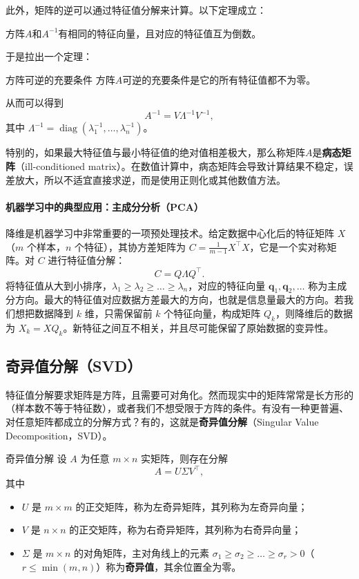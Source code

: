此外，矩阵的逆可以通过特征值分解来计算。以下定理成立：
\begin{theorem}{}{}
    方阵$A$和$A^{-1}$有相同的特征向量，且对应的特征值互为倒数。
\end{theorem}
于是拉出一个定理：
\begin{theorem}{方阵可逆的充要条件}{}
    方阵$A$可逆的充要条件是它的所有特征值都不为零。
\end{theorem}
从而可以得到
\[
    A^{-1} = V \Lambda^{-1} V^{-1},
\]
其中 \(\Lambda^{-1} = \operatorname{diag}(\lambda_1^{-1}, \dots, \lambda_n^{-1})\)。

特别的，如果最大特征值与最小特征值的绝对值相差极大，那么称矩阵$A$是\textbf{病态矩阵}（ill-conditioned matrix）。在数值计算中，病态矩阵会导致计算结果不稳定，误差放大，所以不适宜直接求逆，而是使用正则化或其他数值方法。

\paragraph{机器学习中的典型应用：主成分分析（PCA）}

降维是机器学习中非常重要的一项预处理技术。给定数据中心化后的特征矩阵 \(X\)（\(m\) 个样本，\(n\) 个特征），其协方差矩阵为 \(C = \frac{1}{m-1} X^\top X\)，它是一个实对称矩阵。对 \(C\) 进行特征值分解：
\[
    C = Q \Lambda Q^\top .
\]
将特征值从大到小排序，\(\lambda_1 \ge \lambda_2 \ge \dots \ge \lambda_n\)，对应的特征向量 \(\mathbf{q}_1, \mathbf{q}_2, \dots\) 称为主成分方向。最大的特征值对应数据方差最大的方向，也就是信息量最大的方向。若我们想把数据降到 \(k\) 维，只需保留前 \(k\) 个特征向量，构成矩阵 \(Q_k\)，则降维后的数据为 \(X_k = X Q_k\)。新特征之间互不相关，并且尽可能保留了原始数据的变异性。

\subsection{奇异值分解（SVD）}

特征值分解要求矩阵是方阵，且需要可对角化。然而现实中的矩阵常常是长方形的（样本数不等于特征数），或者我们不想受限于方阵的条件。有没有一种更普遍、对任意矩阵都成立的分解方式？有的，这就是\textbf{奇异值分解}（Singular Value Decomposition，SVD）。

\begin{theorem}{奇异值分解}{}
    设 \(A\) 为任意 \(m \times n\) 实矩阵，则存在分解
    \[
        A = U \Sigma V^\top,
    \]
    其中
    \begin{itemize}
        \item \(U\) 是 \(m \times m\) 的正交矩阵，称为左奇异矩阵，其列称为左奇异向量；
        \item \(V\) 是 \(n \times n\) 的正交矩阵，称为右奇异矩阵，其列称为右奇异向量；
        \item \(\Sigma\) 是 \(m \times n\) 的对角矩阵，主对角线上的元素 \(\sigma_1 \ge \sigma_2 \ge \dots \ge \sigma_r > 0\)（\(r \le \min(m,n)\)）称为\textbf{奇异值}，其余位置全为零。
    \end{itemize}
\end{theorem}

